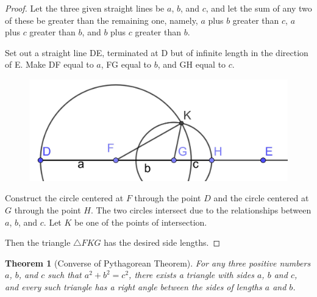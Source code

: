 \documentclass[
]{book}
\newtheorem{theorem}{Theorem}[chapter]
\theoremstyle{definition}
\theoremstyle{definition}
\theoremstyle{definition}
\theoremstyle{definition}
\theoremstyle{remark}
\begin{document}
\begin{proof}
Let the three given straight lines be \(a\), \(b\), and \(c\), and let the sum of any two of these be greater than the remaining one, namely, \(a\) plus \(b\) greater than \(c\), \(a\) plus \(c\) greater than \(b\), and \(b\) plus \(c\) greater than \(b\).

Set out a straight line DE, terminated at D but of infinite length in the direction of E. Make DF equal to \(a\), FG equal to \(b\), and GH equal to \(c\).

\begin{figure}

{\centering \includegraphics[width=0.5\linewidth]{images/prop22a} 

}

\end{figure}

Construct the circle centered at \(F\) through the point \(D\) and the circle centered at \(G\) through the point \(H\). The two circles intersect due to the relationships between \(a\), \(b\), and \(c\). Let \(K\) be one of the points of intersection.

Then the triangle \(\triangle FKG\) has the desired side lengths.
\end{proof}

\begin{theorem}[Converse of Pythagorean Theorem]
For any three positive numbers \(a\), \(b\), and \(c\) such that \(a^2 + b^2 = c^2\), there exists a triangle with sides \(a\), \(b\) and \(c\), and every such triangle has a right angle between the sides of lengths \(a\) and \(b\).
\end{theorem}
\end{document}
